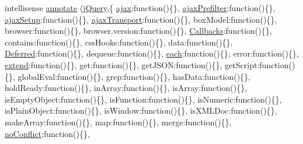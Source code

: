 \begin{DoxyCompactItemize}
\item 
intellisense \hyperlink{jquery-1_810_82_8intellisense_8js_ad1527630d45bb696c9bc5e21e4bd7355}{annotate} (\hyperlink{_scripts_2jquery-1_810_82_8js_a41c2e1bff4a6b292938143764e31d789}{j\+Query},\{ \textquotesingle{}\hyperlink{_scripts_2jquery_8validate_8js_a77004c0fdc08a5bc07afa0b099cdf6df}{ajax}\textquotesingle{}\+:function()\{\}, \textquotesingle{}\hyperlink{_scripts_2jquery-1_810_82_8js_a144939e373cc1ad511a53c4251ec7ffa}{ajax\+Prefilter}\textquotesingle{}\+:function()\{\}, \textquotesingle{}\hyperlink{_scripts_2jquery-1_810_82_8js_a52a40924d02e0d9756f051e36a640cd6}{ajax\+Setup}\textquotesingle{}\+:function()\{\}, \textquotesingle{}\hyperlink{_scripts_2jquery-1_810_82_8js_ade7f5e1842214b9c2ed0c201344a110c}{ajax\+Transport}\textquotesingle{}\+:function()\{\}, \textquotesingle{}box\+Model\textquotesingle{}\+:function()\{\}, \textquotesingle{}browser\textquotesingle{}\+:function()\{\}, \textquotesingle{}browser.\+version\textquotesingle{}\+:function()\{\}, \textquotesingle{}\hyperlink{jquery-1_810_82_8intellisense_8js_add8d59d25831bb9b171fdbee8a18795b}{Callbacks}\textquotesingle{}\+:function()\{\}, \textquotesingle{}contains\textquotesingle{}\+:function()\{\}, \textquotesingle{}css\+Hooks\textquotesingle{}\+:function()\{\}, \textquotesingle{}data\textquotesingle{}\+:function()\{\}, \textquotesingle{}\hyperlink{jquery-1_810_82_8intellisense_8js_ab355ffd82371d88c17da7c1dae9e8829}{Deferred}\textquotesingle{}\+:function()\{\}, \textquotesingle{}dequeue\textquotesingle{}\+:function()\{\}, \textquotesingle{}\hyperlink{_scripts_2jquery-1_810_82_8min_8js_af24c9ea1e34372f8c8b312b35586008d}{each}\textquotesingle{}\+:function()\{\}, \textquotesingle{}error\textquotesingle{}\+:function()\{\}, \textquotesingle{}\hyperlink{_scripts_2jquery_8validate_8js_af5783aaf51391a5134949cfee0f54666}{extend}\textquotesingle{}\+:function()\{\}, \textquotesingle{}get\textquotesingle{}\+:function()\{\}, \textquotesingle{}get\+J\+S\+ON\textquotesingle{}\+:function()\{\}, \textquotesingle{}get\+Script\textquotesingle{}\+:function()\{\}, \textquotesingle{}global\+Eval\textquotesingle{}\+:function()\{\}, \textquotesingle{}grep\textquotesingle{}\+:function()\{\}, \textquotesingle{}has\+Data\textquotesingle{}\+:function()\{\}, \textquotesingle{}hold\+Ready\textquotesingle{}\+:function()\{\}, \textquotesingle{}in\+Array\textquotesingle{}\+:function()\{\}, \textquotesingle{}is\+Array\textquotesingle{}\+:function()\{\}, \textquotesingle{}is\+Empty\+Object\textquotesingle{}\+:function()\{\}, \textquotesingle{}is\+Function\textquotesingle{}\+:function()\{\}, \textquotesingle{}is\+Numeric\textquotesingle{}\+:function()\{\}, \textquotesingle{}is\+Plain\+Object\textquotesingle{}\+:function()\{\}, \textquotesingle{}is\+Window\textquotesingle{}\+:function()\{\}, \textquotesingle{}is\+X\+M\+L\+Doc\textquotesingle{}\+:function()\{\}, \textquotesingle{}make\+Array\textquotesingle{}\+:function()\{\}, \textquotesingle{}map\textquotesingle{}\+:function()\{\}, \textquotesingle{}merge\textquotesingle{}\+:function()\{\}, \textquotesingle{}\hyperlink{_scripts_2bootstrap_8min_8js_ac26971afe341e4079ee34fceab395fc2}{no\+Conflict}\textquotesingle{}\+:function()\{\}, 
\end{DoxyCompactItemize}
